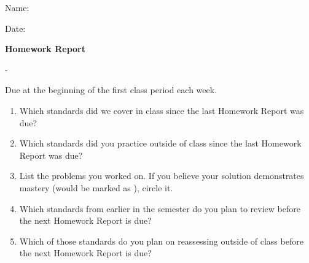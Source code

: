 \documentclass[letterpaper]{article}
\begin{document}
\begin{flushright}
  Name: \underline{\hspace{3in}}

  \vspace{1em}

  Date: \underline{\hspace{2in}}
\end{flushright}

\begin{center}
  \Large
  \textbf{Homework Report}
\end{center}

\begin{center}
  \large \course{} - \prof{}
\end{center}

\begin{center}
  Due at the beginning of the first class period each week.
\end{center}

\begin{enumerate}[1)]
\item Which standards did we cover in class since the last Homework Report
      was due?

      \vfill
\item Which standards did you practice outside of class since the last
      Homework Report was due?

      \vfill
\item List the problems you worked on. If you believe your solution demonstrates
      mastery (would be marked as \masteryMark{}), circle it.

      \vfill\vfill
\item Which standards from earlier in the semester do you plan to review
      before the next Homework Report is due?

      \vfill
\item Which of those standards do you plan on reassessing outside of class
      before the next Homework Report is due?

      \vfill
\end{enumerate}
\end{document}
